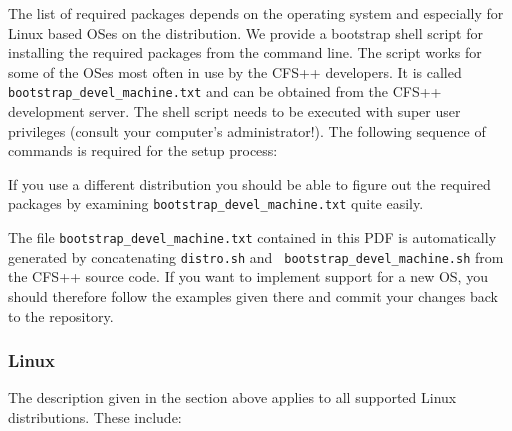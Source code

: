 The list of  required packages depends on the  operating system and especially
for Linux based OSes on the distribution.  We provide a bootstrap shell script
for installing the required packages  from the command line.  The script works
for some of the  OSes most often in use by the  CFS++ developers. It is called
{\tt  bootstrap\_devel\_machine.txt}  and  can  be  obtained  from  the  CFS++
development server.   The shell  script needs to  be executed with  super user
privileges (consult  your computer's administrator!).   The following sequence
of commands is required for the setup process:



If  you use a  different distribution  you should  be able  to figure  out the
required  packages  by  examining  {\tt  bootstrap\_devel\_machine.txt}  quite
easily.

The  file  {\tt  bootstrap\_devel\_machine.txt}   contained  in  this  PDF  is
automatically   generated   by   concatenating  {\tt   distro.sh}   and   {\tt
  bootstrap\_devel\_machine.sh} from  the CFS++ source  code.  If you  want to
implement support for a new OS, you should therefore follow the examples given
there and commit your changes back to the repository.

\subsubsection{Linux}

The  description given in  the section  above applies  to all  supported Linux
distributions. These include:

